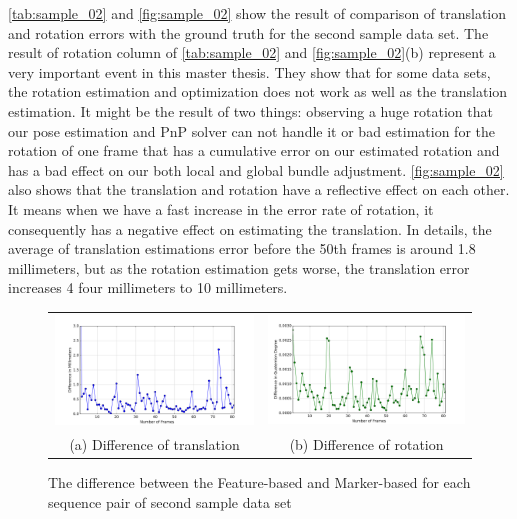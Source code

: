 \autoref{tab:sample_02} and \autoref{fig:sample_02} show the result of comparison of translation and rotation errors with the ground truth for the second sample data set. The result of rotation column of \autoref{tab:sample_02} and \autoref{fig:sample_02}(b) represent a very important event in this master thesis. They show that for some data sets, the rotation estimation and optimization does not work as well as the translation estimation. 
It might be the result of two things: observing a huge rotation that our pose estimation and PnP solver can not handle it or bad estimation for the rotation of one frame that has a cumulative error on our estimated rotation and has a bad effect on our both local and global bundle adjustment. \autoref{fig:sample_02} also shows that the translation and rotation have a reflective effect on each other. It means when we have a fast increase in the error rate of rotation, it consequently has a negative effect on estimating the translation. In details, the average of translation estimations error before the 50th frames is around 1.8 millimeters, but as the rotation estimation gets worse, the translation error increases 4 four millimeters to 10 millimeters.

\begin{figure}[H]
\begin{tabular}{cc}
  \includegraphics[width=80mm]{figures/diff_400/graph_translation} &  \includegraphics[width=80mm]{figures/diff_400/graph_rotation} \\
(a) Difference of translation & (b) Difference of rotation \\[6pt]
\end{tabular}
\caption{The difference between the Feature-based and Marker-based for each sequence pair of second sample data set}\label{fig:sample_02_diff}
\end{figure}

